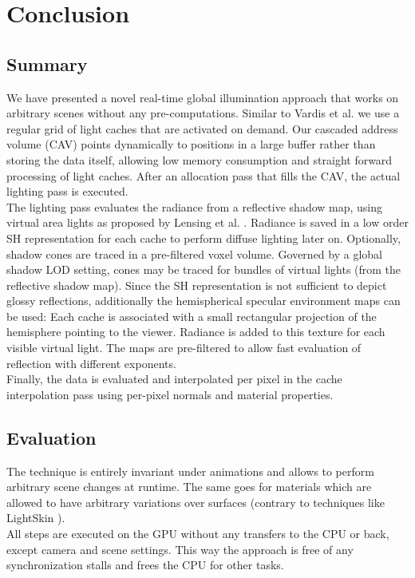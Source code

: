 \documentclass[thesis.tex]{subfiles}
\begin{document}
\chapter{Conclusion}\label{chap:concl}

\section{Summary}
We have presented a novel real-time global illumination approach that works on arbitrary scenes without any pre-computations.
Similar to Vardis et al. \cite{bib:radiancecachechromaticcompression} we use a regular grid of light caches that are activated on demand.
Our cascaded address volume (CAV) points dynamically to positions in a large buffer rather than storing the data itself, allowing low memory consumption and straight forward processing of light caches.
After an allocation pass that fills the CAV, the actual lighting pass is executed.
\\
The lighting pass evaluates the radiance from a reflective shadow map, using virtual area lights as proposed by Lensing et al. \cite{bib:LightskinPaper}.
Radiance is saved in a low order SH representation for each cache to perform diffuse lighting later on.
Optionally, shadow cones are traced in a pre-filtered voxel volume.
Governed by a global shadow LOD setting, cones may be traced for bundles of virtual lights (from the reflective shadow map).
Since the SH representation is not sufficient to depict glossy reflections, additionally the hemispherical specular environment maps can be used:
Each cache is associated with a small rectangular projection of the hemisphere pointing to the viewer.
Radiance is added to this texture for each visible virtual light.
The maps are pre-filtered to allow fast evaluation of reflection with different exponents.
\\
Finally, the data is evaluated and interpolated per pixel in the cache interpolation pass using per-pixel normals and material properties.


\section{Evaluation}

The technique is entirely invariant under animations and allows to perform arbitrary scene changes at runtime.
The same goes for materials which are allowed to have arbitrary variations over surfaces (contrary to techniques like LightSkin \cite{bib:LightskinPaper}).
\\
All steps are executed on the GPU without any transfers to the CPU or back, except camera and scene settings.
This way the approach is free of any synchronization stalls and frees the CPU for other tasks.
\end{document}
